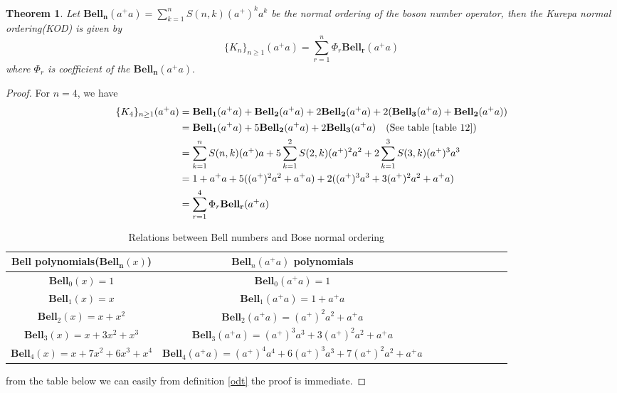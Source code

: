 \documentclass[pdflatex,sn-mathphys-num]{sn-jnl}%
\newtheorem{theorem}{Theorem}
\theoremstyle{thmstyleone}%
\theoremstyle{thmstyletwo}%
\theoremstyle{thmstylethree}%
\begin{document}
\begin{theorem}
    Let $\mathbf{Bell_n}(a^{\mathbb{+}}a)=\sum_{k = 1}^{n} S(n, k) (a^{\mathbb{+}})^k a^k$ be the normal ordering of the boson number operator, then the Kurepa normal ordering(KOD) is given by 
    $$\lbrace K_n\rbrace_{n\geq 1}(a^{\mathbb{+}}a)=\sum_{r=1}^{n} \Phi_r \mathbf{Bell_r}(a^{\mathbb{+}}a) $$
   where $\Phi_r$ is coefficient of the  $\mathbf{Bell_n}(a^{\mathbb{+}}a).$
\end{theorem}
\begin{proof}
    For $n=4$, we have 
    \begin{align*}
        \lbrace K_4\rbrace_{n\geq 1}(a^{\mathbb{+}}a)&=\mathbf{Bell_1}(a^{\mathbb{+}}a) + \mathbf{Bell_2}(a^{\mathbb{+}}a)+2 \mathbf{Bell_2}(a^{\mathbb{+}}a)  + 2 (\mathbf{Bell_3}(a^{\mathbb{+}}a) + \mathbf{Bell_2}(a^{\mathbb{+}}a))    \\
        &= \mathbf{Bell_1}(a^{\mathbb{+}}a) + 5\mathbf{Bell_2}(a^{\mathbb{+}}a) + 2 \mathbf{Bell_3}(a^{\mathbb{+}}a)  \quad (\mbox{See table \ref{table 12}})      \\
        &=\sum_{k = 1}^{n} S(n, k) (a^{\mathbb{+}})a +5\sum_{k = 1}^{2} S(2, k) (a^{\mathbb{+}})^2 a^2 + 2\sum_{k = 1}^{3} S(3, k) (a^{\mathbb{+}})^3 a^3\\
        &=1 + a^{\mathbb{+}}a + 5((a^{\mathbb{+}})^2 a^2+a^{\mathbb{+}}a )+ 2((a^{\mathbb{+}})^3 a^3+3(a^{\mathbb{+}})^2 a^2+a^{\mathbb{+}}a )  \\
        &=\sum_{r=1}^{4} \Phi_r \mathbf{Bell_r}(a^{\mathbb{+}}a)
    \end{align*}

\begin{table}[!ht]
    \centering
    \begin{tabular}{|c|c|c|c|c|a|c|c|c|c|}\hline 
        Bell polynomials($\mathbf{Bell_n}(x)$)& $\mathbf{Bell}_n(a^{\mathbb{+}}a)$ polynomials  \\\hline 
         $\mathbf{Bell}_0(x) = 1$ &$\mathbf{Bell}_0(a^{\mathbb{+}}a) = 1$\\\hline
        $\mathbf{Bell}_1(x) = x$ & $\mathbf{Bell}_1(a^{\mathbb{+}}a) = 1 + a^{\mathbb{+}}a$ \\\hline
          $\mathbf{Bell}_2(x) = x+x^2$  & $\mathbf{Bell}_2(a^{\mathbb{+}}a)  = (a^{\mathbb{+}})^2 a^2+a^{\mathbb{+}}a$ \\\hline
            $\mathbf{Bell}_3(x) = x+3x^2+x^3$  & $\mathbf{Bell}_3(a^{\mathbb{+}}a) = (a^{\mathbb{+}})^3 a^3+3(a^{\mathbb{+}})^2 a^2+a^{\mathbb{+}}a$ \\\hline
              $\mathbf{Bell}_4(x) = x+7x^2+6x^3+x^4$ & $\mathbf{Bell}_4(a^{\mathbb{+}}a) = (a^{\mathbb{+}})^4 a^4+6(a^{\mathbb{+}})^3 a^3+7(a^{\mathbb{+}})^2 a^2+a^{\mathbb{+}}a$ \\\hline
    \end{tabular}
    \caption{Relations between Bell numbers and Bose normal ordering \cite{OEIS:A003422} }
    \label{table 12}
\end{table}
    
   from the table below we can easily from definition \ref{odt} the proof is immediate.
\end{proof}
\end{document}
